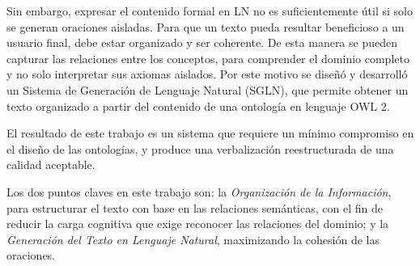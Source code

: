 Sin embargo, expresar el contenido formal en LN no es suficientemente útil si solo se generan oraciones aisladas. Para que un texto pueda resultar beneficioso a un usuario final, debe estar organizado y ser coherente. De esta manera se pueden capturar las relaciones entre los conceptos, para comprender el dominio completo y no solo interpretar sus axiomas aislados. Por este motivo se diseñó y desarrolló un Sistema de Generación de Lenguaje Natural (SGLN), que permite obtener un texto organizado a partir del contenido de una ontología en lenguaje OWL 2.%


El resultado de este trabajo es un sistema que requiere un mínimo compromiso en el diseño de las ontologías, y produce una verbalización reestructurada de una calidad aceptable.


Los dos puntos claves en este trabajo son: la \textit{Organización de la Información}, para estructurar el texto con base en las relaciones semánticas, con el fin de reducir la carga cognitiva que exige reconocer las relaciones del dominio; y la \textit{Generación del Texto en Lenguaje Natural}, maximizando la cohesión de las oraciones.

\vfill
\pagebreak
